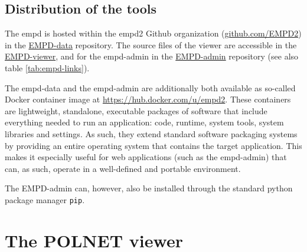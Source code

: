 \begin{refsection}
\subsection{Distribution of the tools}\label{sec:empd-accessibility}

The \gls{empd} is hosted within the \gls{empd}2 Github organization (\href{https://github.com/EMPD2}{github.com/EMPD2}) in the \href{https://github.com/EMPD2/EMPD-data}{{EMPD-data}} repository. The source files of the viewer are accessible in the
\href{https://github.com/EMPD2/EMPD-viewer}{{EMPD-viewer}}, and for the \gls{empd}-admin in the {\href{https://github.com/EMPD2/EMPD-admin}{{EMPD-admin}}} repository (see also table \ref{tab:empd-links}).

The \gls{empd}-data and the \gls{empd}-admin are additionally both available as so-called Docker container image at \url{https://hub.docker.com/u/empd2}. These containers are lightweight, standalone, executable packages of software that include everything needed to run an application: code, runtime, system tools, system libraries and settings. As such, they extend standard software packaging systems by providing an entire operating system that contains the target application. This makes it especially useful for web applications (such as the \gls{empd}-admin) that can, as such, operate in a well-defined and portable environment.

The EMPD-admin can, however, also be installed through the standard python package manager \texttt{pip}.

\section{The POLNET viewer} \label{sec:polnet-viewer}


\end{refsection}
